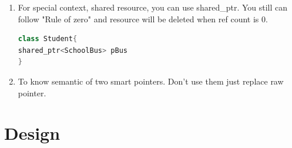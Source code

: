 \documentclass[a4paper,12pt,twoside]{book}
\begin{document}
\begin{itemize}
\begin{enumerate}
\item For special context, shared resource, you can use shared\_ptr.  You still can follow "Rule of zero" and resource will be deleted when ref count is 0.
\begin{lstlisting}[frame=single, language=c++]
class Student{
shared_ptr<SchoolBus> pBus
}
\end{lstlisting}

\item To know semantic of two smart pointers. Don't use them just replace raw pointer.
\end{enumerate}

\end{itemize}

\section{Design}
\end{document}
